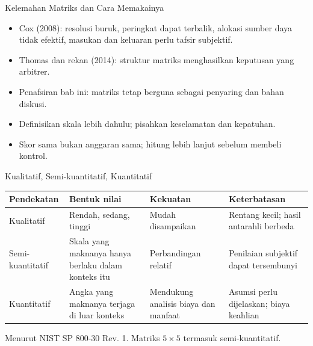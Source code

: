 \documentclass[aspectratio=169, table, 12pt]{beamer}
\begin{document}
\begin{frame}{{\Large Kelemahan Matriks dan Cara Memakainya}}
  \vspace{6pt}
  \small
  \begin{itemize}
    \item Cox (2008): resolusi buruk, peringkat dapat terbalik, alokasi sumber daya tidak efektif,
          masukan dan keluaran perlu tafsir subjektif.
    \item Thomas dan rekan (2014): struktur matriks menghasilkan keputusan yang arbitrer.
    \item Penafsiran bab ini: matriks tetap berguna sebagai penyaring dan bahan diskusi.
    \item Definisikan skala lebih dahulu; pisahkan keselamatan dan kepatuhan.
    \item Skor sama bukan anggaran sama; hitung lebih lanjut sebelum membeli kontrol.
  \end{itemize}
\end{frame}

\begin{frame}{{\Large Kualitatif, Semi-kuantitatif, Kuantitatif}}
  \vspace{2pt}
  \footnotesize
  \begin{tabularx}{\textwidth}{|>{\raggedright\arraybackslash}p{}|>{\raggedright\arraybackslash}X|>{\raggedright\arraybackslash}X|>{\raggedright\arraybackslash}X|}
    \hline
    \textbf{Pendekatan} & \textbf{Bentuk nilai} & \textbf{Kekuatan} & \textbf{Keterbatasan} \\ \hline
    Kualitatif & Rendah, sedang, tinggi & Mudah disampaikan & Rentang kecil; hasil antarahli berbeda \\
    \hline
    Semi-kuantitatif & Skala yang maknanya hanya berlaku dalam konteks itu & Perbandingan relatif &
    Penilaian subjektif dapat tersembunyi \\ \hline
    Kuantitatif & Angka yang maknanya terjaga di luar konteks & Mendukung analisis biaya dan manfaat &
    Asumsi perlu dijelaskan; biaya keahlian \\ \hline
  \end{tabularx}

  \vspace{6pt}
  \small Menurut NIST SP 800-30 Rev. 1. Matriks $5 \times 5$ termasuk semi-kuantitatif.
\end{frame}
\end{document}
